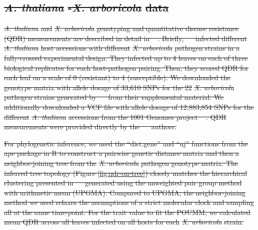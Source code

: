 \documentclass[12pt]{article} %
\providecommand{\DIFdel}[1]{{\protect\color{red}\sout{#1}}}                      %
\providecommand{\DIFdelbegin}{} %
\newcommand{\DIFscaledelfig}{0.5}
\newlength{\DIFdelgraphicswidth} %
\newlength{\DIFdelgraphicsheight} %
\newcommand{\DIFdelincludegraphics}[2][]{%
\sbox{\DIFdelgraphicsbox}{\DIFOincludegraphics[#1]{#2}}%
\settoboxwidth{\DIFdelgraphicswidth}{\DIFdelgraphicsbox} %
\settoboxtotalheight{\DIFdelgraphicsheight}{\DIFdelgraphicsbox} %
\scalebox{\DIFscaledelfig}{%
\parbox[b]{\DIFdelgraphicswidth}{\usebox{\DIFdelgraphicsbox}\\[-\baselineskip] \rule{\DIFdelgraphicswidth}{0em}}\llap{\resizebox{\DIFdelgraphicswidth}{\DIFdelgraphicsheight}{%
\setlength{\unitlength}{\DIFdelgraphicswidth}%
\begin{picture}(1,1)%
\thicklines\linethickness{2pt} %
{\color[rgb]{1,0,0}\put(0,0){\framebox(1,1){}}}%
{\color[rgb]{1,0,0}\put(0,0){\line( 1,1){1}}}%
{\color[rgb]{1,0,0}\put(0,1){\line(1,-1){1}}}%
\end{picture}%
}\hspace*{3pt}}} %
} %
\DeclareRobustCommand{\DIFdelbegin}{\DIFOdelbegin \let\includegraphics\DIFdelincludegraphics} %
\begin{document}
\begin{doublespace}
\DIFdelbegin \subsection*{\emph{\DIFdel{A. thaliana}}%
\DIFdel{-}\emph{\DIFdel{X. arboricola}} %
\DIFdel{data}}
\emph{\DIFdel{A. thaliana}} %
\DIFdel{and }\emph{\DIFdel{X. arboricola}} %
\DIFdel{genotyping and quantitative disease resistance (QDR) measurements are described in detail in \mbox{%
\cite{Wang2018Two-wayGenomes}}\hskip0pt%
. Briefly, \mbox{%
\cite{Wang2018Two-wayGenomes} }\hskip0pt%
infected different }\emph{\DIFdel{A. thaliana}} %
\DIFdel{host accessions with different }\emph{\DIFdel{X. arboricola}} %
\DIFdel{pathogen strains in a fully-crossed experimental design. They infected up to 4 leaves on each of three biological replicates for each host-pathogen pairing. Then, they scored QDR for each leaf on a scale of 0 (resistant) to 4 (susceptible). We downloaded the genotype matrix with allele dosage of 33,610 SNPs for the 22 }\emph{\DIFdel{X. arboricola}} %
\DIFdel{pathogen strains generated by \mbox{%
\cite{Wang2018Two-wayGenomes} }\hskip0pt%
from their supplemental material. We additionally downloaded a VCF file with allele dosage of 12,883,854 SNPs for the different }\emph{\DIFdel{A. thaliana}} %
\DIFdel{accessions from the 1001 Genomes project \mbox{%
\citep{Alonso-Blanco20161135Thaliana}}\hskip0pt%
. QDR measurements were provided directly by the  \mbox{%
\cite{Wang2018Two-wayGenomes} }\hskip0pt%
authors.
}%

\DIFdel{For phylogenetic inference, we used the ``dist.gene'' and ``nj'' functions from the ape package in R to construct a pairwise genetic distance matrix and then a neighbor-joining tree from the }\emph{\DIFdel{X. arboricola}} %
\DIFdel{pathogen genotype matrix. The inferred tree topology (Figure \ref{fig:qdr-on-tree}) closely matches the hierarchical clustering presented in \mbox{%
\citep{Wang2018Two-wayGenomes} }\hskip0pt%
generated using the unweighted pair group method with arithmetic mean (UPGMA). Compared to UPGMA, the neighbor-joining method we used relaxes the assumptions of a strict molecular clock and sampling all at the same time-point. For the trait value to fit the POUMM, we calculated mean QDR across all leaves infected on all hosts for each }\emph{\DIFdel{X. arboricola}} %
\DIFdel{strain.
}%


\end{doublespace}
\end{document}
